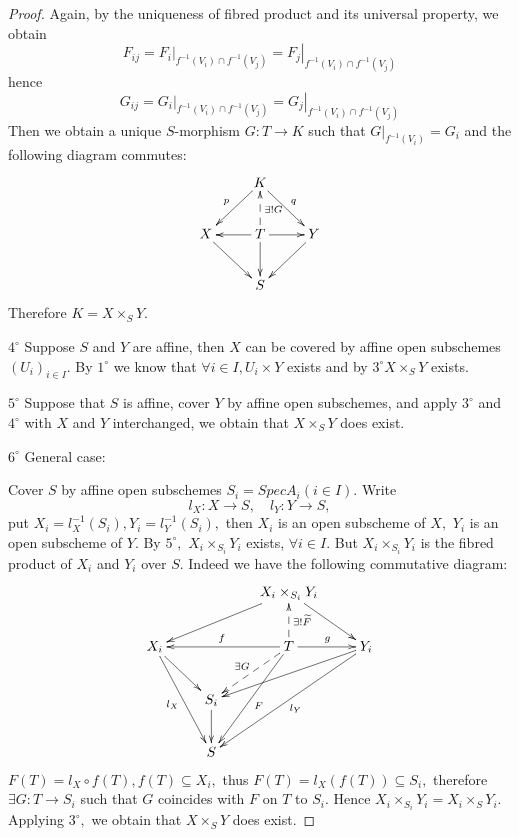 \begin{proof}
Again, by the uniqueness of  fibred product and its universal
property, we obtain $$F_{ij} = \left.F_i\right|_{f^{-1}(V_i)\cap
f^{-1}(V_j)} = \left.F_j\right|_{f^{-1}(V_i)\cap f^{-1}(V_j)}$$
hence $$G_{ij} = \left.G_i\right|_{f^{-1}(V_i)\cap f^{-1}(V_j)} =
\left.G_j\right|_{f^{-1}(V_i)\cap f^{-1}(V_j)}$$ Then we obtain a
unique $S$-morphism $G: T\rightarrow K$ such that
$\left.G\right|_{f^{-1}(V_i)} = G_i$ and the following diagram
commutes:
\[ \xymatrix{
   & K \ar"2,1"_p \ar"2,3"^q \\
   X \ar"3,2" & T \ar[l] \ar[r] \ar@{-->}[u]_{\exists !G} \ar[d] & Y \ar"3,2"\\
   & S}     \]
Therefore $K = X\times_S Y.$

$\mathit{4^{\circ}}$ Suppose $S$ and $Y$ are affine, then $X$ can be
covered by affine open subschemes $(U_i)_{i\in I}.$ By
$\mathit{1^{\circ}}$ we know that $\forall i\in I, U_i\times Y$
exists and by $\mathit{3^{\circ}} X\times_S Y$ exists.

$\mathit{5^{\circ}}$ Suppose that $S$ is affine, cover $Y$ by affine
open subschemes, and apply $\mathit{3^{\circ}}$ and
$\mathit{4^{\circ}}$ with $X$ and $Y$ interchanged, we obtain that
$X\times_S Y$ does exist.

$\mathit{6^{\circ}}$ General case:

Cover $S$ by affine open subschemes $S_i = SpecA_i(i\in I).$ Write
$$l_X: X\rightarrow S,\quad l_Y: Y\rightarrow S,$$ put $X_i =
l_X^{-1}(S_i), Y_i = l_Y^{-1}(S_i),$ then $X_i$ is an open subscheme
of $X,$ $Y_i$ is an open subscheme of $Y.$ By $\mathit{5^{\circ}},$
$X_i\times_{S_i} Y_i$ exists, $\forall i\in I.$ But $X_i\times_{S_i}
Y_i$ is the fibred product of $X_i$ and $Y_i$ over $S.$ Indeed we
have the following commutative diagram:
\[ \xymatrix{
   & & {X_i\times_{S_i} Y_i} \ar"2,1" \ar"2,4"                   \\
   X_i \ar"3,2" \ar"4,2"_{l_X} & & T \ar@{-->}"1,3"_{\exists !
   \widetilde{F}} \ar[r]^g \ar"2,1"_f \ar"4,2"^F \ar@{-->}"3,2"_{\exists G}
   & Y_i \ar"4,2"^{l_Y} \ar"3,2"                       \\
   & S_i \ar"4,2"                                               \\
   & S}    \]
$F(T) = l_X\circ f(T), f(T)\subseteq X_i,$ thus $F(T) =
l_X(f(T))\subseteq S_i,$ therefore $\exists G: T\rightarrow S_i$
such that $G$ coincides with $F$ on $T$ to $S_i.$ Hence
$X_i\times_{S_i} Y_i = X_i\times_S Y_i.$ Applying
$\mathit{3^{\circ}},$ we obtain that $X\times_S Y$ does exist.
\end{proof}
